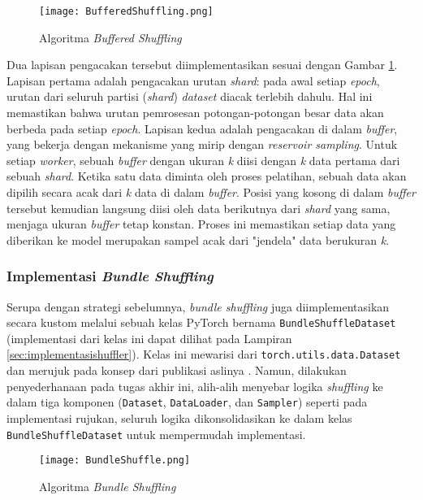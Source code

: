 \begin{figure}[t]
    \centering
    \texttt{[image: BufferedShuffling.png]}
    \caption{Algoritma \textit{Buffered Shuffling}}
    \label{fig:BufferedShuffling}
\end{figure}

Dua lapisan pengacakan tersebut diimplementasikan sesuai dengan Gambar \ref{fig:BufferedShuffling}. Lapisan pertama adalah pengacakan urutan \textit{shard}: pada awal setiap \textit{epoch}, urutan dari seluruh partisi (\textit{shard}) \textit{dataset} diacak terlebih dahulu. Hal ini memastikan bahwa urutan pemrosesan potongan-potongan besar data akan berbeda pada setiap \textit{epoch}. Lapisan kedua adalah pengacakan di dalam \textit{buffer}, yang bekerja dengan mekanisme yang mirip dengan \textit{reservoir sampling}. Untuk setiap \textit{worker}, sebuah \textit{buffer} dengan ukuran \textit{k} diisi dengan \textit{k} data pertama dari sebuah \textit{shard}. Ketika satu data diminta oleh proses pelatihan, sebuah data akan dipilih secara acak dari \textit{k} data di dalam \textit{buffer}. Posisi yang kosong di dalam \textit{buffer} tersebut kemudian langsung diisi oleh data berikutnya dari \textit{shard} yang sama, menjaga ukuran \textit{buffer} tetap konstan. Proses ini memastikan setiap data yang diberikan ke model merupakan sampel acak dari "jendela" data berukuran \textit{k}.

\subsubsection{Implementasi \textit{Bundle Shuffling}}
Serupa dengan strategi sebelumnya, \textit{bundle shuffling} juga diimplementasikan secara kustom melalui sebuah kelas PyTorch bernama \texttt{BundleShuffleDataset} (implementasi dari kelas ini dapat dilihat pada Lampiran \ref{sec:implementasishuffler}). Kelas ini mewarisi dari \texttt{torch.utils.data.Dataset} dan merujuk pada konsep dari publikasi aslinya \parencite{BundleShuffle}. Namun, dilakukan penyederhanaan pada tugas akhir ini, alih-alih menyebar logika \textit{shuffling} ke dalam tiga komponen (\texttt{Dataset}, \texttt{DataLoader}, dan \texttt{Sampler}) seperti pada implementasi rujukan, seluruh logika dikonsolidasikan ke dalam kelas \texttt{BundleShuffleDataset} untuk mempermudah implementasi.

\begin{figure}[t]
    \centering
    \texttt{[image: BundleShuffle.png]}
    \caption{Algoritma \textit{Bundle Shuffling}}
    \parencite{BundleShuffle}
    \label{fig:BundleShuffling}
\end{figure}

